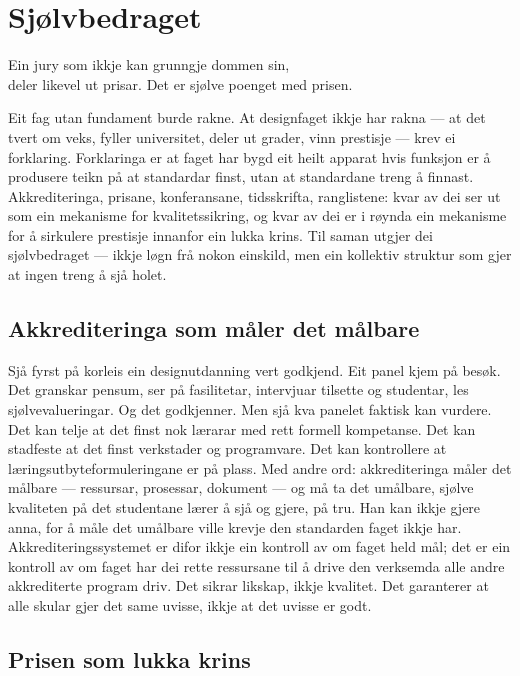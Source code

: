 \chapter{Sjølvbedraget}

\begin{motto}
Ein jury som ikkje kan grunngje dommen sin,\\ deler likevel ut prisar. Det er sjølve poenget med prisen.
\end{motto}

Eit fag utan fundament burde rakne. At designfaget ikkje har rakna — at det tvert om veks, fyller universitet, deler ut grader, vinn prestisje — krev ei forklaring. Forklaringa er at faget har bygd eit heilt apparat hvis funksjon er å produsere teikn på at standardar finst, utan at standardane treng å finnast. Akkrediteringa, prisane, konferansane, tidsskrifta, ranglistene: kvar av dei ser ut som ein mekanisme for kvalitetssikring, og kvar av dei er i røynda ein mekanisme for å sirkulere prestisje innanfor ein lukka krins. Til saman utgjer dei sjølvbedraget — ikkje løgn frå nokon einskild, men ein kollektiv struktur som gjer at ingen treng å sjå holet.

\section{Akkrediteringa som måler det målbare}

Sjå fyrst på korleis ein designutdanning vert godkjend. Eit panel kjem på besøk. Det granskar pensum, ser på fasilitetar, intervjuar tilsette og studentar, les sjølvevalueringar. Og det godkjenner. Men sjå kva panelet faktisk kan vurdere. Det kan telje at det finst nok lærarar med rett formell kompetanse. Det kan stadfeste at det finst verkstader og programvare. Det kan kontrollere at læringsutbyteformuleringane er på plass. Med andre ord: akkrediteringa måler det målbare — ressursar, prosessar, dokument — og må ta det umålbare, sjølve kvaliteten på det studentane lærer å sjå og gjere, på tru. Han kan ikkje gjere anna, for å måle det umålbare ville krevje den standarden faget ikkje har. Akkrediteringssystemet er difor ikkje ein kontroll av om faget held mål; det er ein kontroll av om faget har dei rette ressursane til å drive den verksemda alle andre akkrediterte program driv. Det sikrar likskap, ikkje kvalitet. Det garanterer at alle skular gjer det same uvisse, ikkje at det uvisse er godt.

\section{Prisen som lukka krins}

